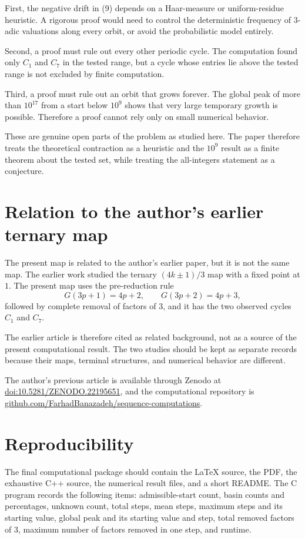 \documentclass[11pt]{article}
\begin{document}
First, the negative drift in (9) depends on a Haar-measure or uniform-residue heuristic. A rigorous proof would need to control the deterministic frequency of $3$-adic valuations along every orbit, or avoid the probabilistic model entirely.

Second, a proof must rule out every other periodic cycle. The computation found only $C_1$ and $C_7$ in the tested range, but a cycle whose entries lie above the tested range is not excluded by finite computation.

Third, a proof must rule out an orbit that grows forever. The global peak of more than $10^{17}$ from a start below $10^9$ shows that very large temporary growth is possible. Therefore a proof cannot rely only on small numerical behavior.

These are genuine open parts of the problem as studied here. The paper therefore treats the theoretical contraction as a heuristic and the $10^9$ result as a finite theorem about the tested set, while treating the all-integers statement as a conjecture.

\section{Relation to the author's earlier ternary map}
The present map is related to the author's earlier paper, but it is not the same map. The earlier work studied the ternary $(4k\pm1)/3$ map with a fixed point at $1$. The present map uses the pre-reduction rule
\[
G(3p+1)=4p+2,
\qquad
G(3p+2)=4p+3,
\]
followed by complete removal of factors of $3$, and it has the two observed cycles $C_1$ and $C_7$.

The earlier article is therefore cited as related background, not as a source of the present computational result. The two studies should be kept as separate records because their maps, terminal structures, and numerical behavior are different.

The author's previous article is available through Zenodo at
\href{https://doi.org/10.5281/ZENODO.22195651}{doi:10.5281/ZENODO.22195651},
and the computational repository is
\href{https://github.com/FarhadBanazadeh/sequence-computations}{github.com/FarhadBanazadeh/sequence-computations}.

\section{Reproducibility}
The final computational package should contain the LaTeX source, the PDF, the exhaustive C++ source, the numerical result files, and a short README. The C program records the following items: admissible-start count, basin counts and percentages, unknown count, total steps, mean steps, maximum steps and its starting value, global peak and its starting value and step, total removed factors of $3$, maximum number of factors removed in one step, and runtime.
\end{document}
